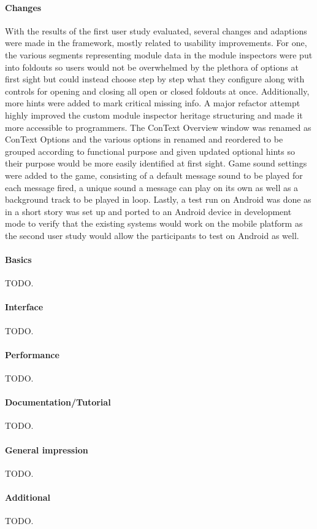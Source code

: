 \paragraph{Changes} With the results of the first user study evaluated, several changes and adaptions were made in the framework, mostly related to usability improvements. For one, the various segments representing module data in the module inspectors were put into foldouts so users would not be overwhelmed by the plethora of options at first sight but could instead choose step by step what they configure along with controls for opening and closing all open or closed foldouts at once. Additionally, more hints were added to mark critical missing info. A major refactor attempt highly improved the custom module inspector heritage structuring and made it more accessible to programmers. 
The ConText Overview window was renamed as ConText Options and the various options in renamed and reordered to be grouped according to functional purpose and given updated optional hints so their purpose would be more easily identified at first sight. 
Game sound settings were added to the game, consisting of a default message sound to be played for each message fired, a unique sound a message can play on its own as well as a background track to be played in loop. 
Lastly, a test run on Android was done as in a short story was set up and ported to an Android device in development mode to verify that the existing systems would work on the mobile platform as the second user study would allow the participants to test on Android as well. 
\paragraph{Basics} TODO.
\paragraph{Interface} TODO.
\paragraph{Performance} TODO.
\paragraph{Documentation/Tutorial} TODO.
\paragraph{General impression} TODO.
\paragraph{Additional} TODO.

